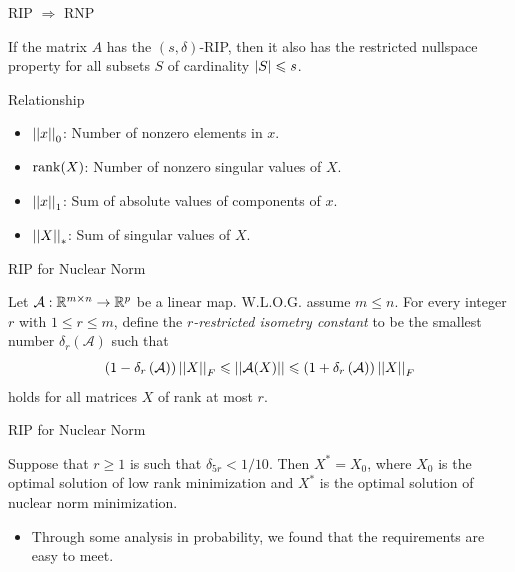\documentclass{beamer}
\begin{document}
\begin{frame}{RIP \(\Rightarrow\) RNP}
    \begin{theorem}
        If the matrix \(A\) has the \((s,\delta)\)-RIP, then it also has the restricted nullspace property for all subsets \(S\) of cardinality \(\left|S\right|\leqslant s\).
    \end{theorem}
\end{frame}

\begin{frame}{Relationship}
    \begin{itemize}
        \item \(\left|\left|x\right|\right|_0\): Number of nonzero elements in \(x\).
        \item \(\operatorname{rank}(X)\): Number of nonzero singular values of \(X\).
        \item \(\left|\left|x\right|\right|_1\): Sum of absolute values of components of \(x\).
        \item \(\left|\left|X\right|\right|_\ast\): Sum of singular values of \(X\).
    \end{itemize}
\end{frame}

\begin{frame}{RIP for Nuclear Norm}
    \begin{definition}
        Let \(\mathcal A:\mathbb R^{m\times n}\to\mathbb R^p\) be a linear map. W.L.O.G. assume \(m\leqslant n\). For every integer \(r\) with \(1\leqslant r\leqslant m\), define the \emph{\(r\)-restricted isometry constant} to be the smallest number \(\delta_r(\mathcal A)\) such that
        \[\left(1-\delta_r\left(\mathcal A\right)\right)\left|\left|X\right|\right|_F\leqslant\left|\left|\mathcal A(X)\right|\right|\leqslant\left(1+\delta_r\left(\mathcal A\right)\right)\left|\left|X\right|\right|_F\]
        holds for all matrices \(X\) of rank at most \(r\).
    \end{definition}
\end{frame}

\begin{frame}{RIP for Nuclear Norm}
    \begin{theorem}
        Suppose that \(r\geqslant 1\) is such that \(\delta_{5r}<1/10\). Then \(X^\ast=X_0\), where \(X_0\) is the optimal solution of low rank minimization and \(X^\ast\) is the optimal solution of nuclear norm minimization.
    \end{theorem}
    \pause
    \begin{itemize}
        \item Through some analysis in probability, we found that the requirements are easy to meet.
    \end{itemize}
\end{frame}
\end{document}
